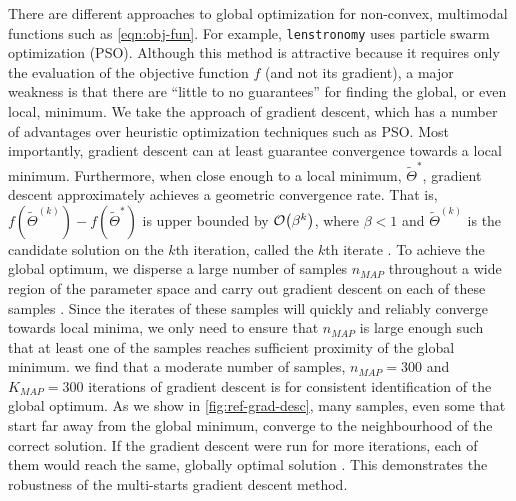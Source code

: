 There are different approaches to global optimization for non-convex, multimodal functions such as \cref{eqn:obj-fun}.
For example, \texttt{lenstronomy} uses particle swarm optimization (PSO). Although this method is attractive because it requires only the evaluation of the objective function $f$ (and not its gradient), 
a major weakness is that there are ``little to no guarantees'' \citep{sengupta2018} for finding the global, or even local, minimum.
We take the approach of gradient descent, 
which has a number of advantages over 
heuristic optimization techniques such as PSO. 
Most importantly, gradient descent can at least guarantee convergence towards a local minimum. 
Furthermore, when close enough to a local minimum, $\tilde{\Theta}^*$,
gradient descent approximately achieves a geometric convergence rate. %
That is, $f(\tilde{\Theta}^{(k)}) - f(\tilde{\Theta}^*)$ is upper bounded by $\order{\beta^k}$, where $\beta < 1$ and $\tilde{\Theta}^{(k)}$ is the candidate solution on the $k$th iteration, called the $k$th iterate \citep{nesterov2014}.
To achieve the global optimum, we disperse a large number of samples $n_{MAP}$ throughout a wide region of the parameter space and carry out gradient descent on each of these samples \citep{marti2003,gyorgy2011}. 
Since the iterates of these samples will quickly and reliably converge towards local minima, we only need to ensure that $n_{MAP}$ is large enough such that at least one of the samples %
reaches sufficient proximity of the global minimum.  we find that a moderate number of samples, $n_{MAP} = 300$ and $K_{MAP}=300$ iterations of gradient descent is  for consistent identification of the global optimum. 
As we show in \cref{fig:ref-grad-desc}, many samples, even some that start far away from the global minimum, converge to the neighbourhood of the correct solution. If the gradient descent were run for more iterations, each of them would reach the same, globally optimal solution .  This demonstrates the robustness of the multi-starts gradient descent method. 

